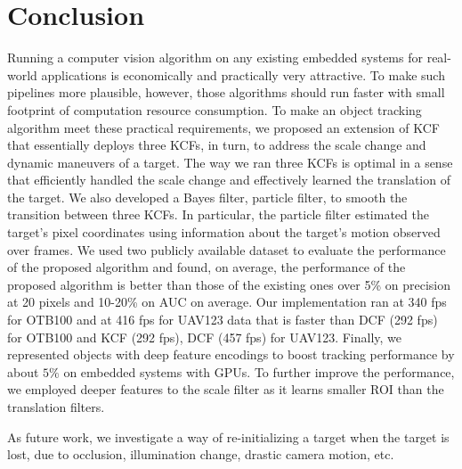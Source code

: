 \documentclass[10pt,twocolumn,letterpaper]{article}
\begin{document}
\section{Conclusion} \label{sc:Conclusion}
Running a computer vision algorithm on any existing embedded systems
for real-world applications is economically and practically very
attractive. To make such pipelines more plausible, however, those
algorithms should run faster with small footprint of computation
resource consumption. To make an object tracking algorithm meet these
practical requirements, we proposed an extension of KCF that
essentially deploys three KCFs, in turn, to address the scale change
and dynamic maneuvers of a target. The way we ran three KCFs is
optimal in a sense that efficiently handled the scale change and
effectively learned the translation of the target. We also developed a
Bayes filter, particle filter, to smooth the transition between three
KCFs. In particular, the particle filter estimated the target's pixel
coordinates using information about the target's motion observed over
frames. We used two publicly available dataset to evaluate the
performance of the proposed algorithm and found, on average, the
performance of the proposed algorithm is better than those of the
existing ones over 5\% on precision at 20 pixels and 10-20\% on AUC on
average. Our implementation ran at 340 fps for OTB100 and at 416 fps
for UAV123 data that is faster than DCF (292 fps) for OTB100 and KCF
(292 fps), DCF (457 fps) for UAV123. Finally, we represented objects with deep
feature encodings to boost tracking performance by about $5\%$ on embedded systems with GPUs. 
To further improve the performance, we employed deeper features to the scale filter as it learns smaller ROI
than the translation filters.

As future work, we investigate a way of re-initializing a target when
the target is lost, due to occlusion, illumination change, drastic
camera motion, etc.

{\small


}
\end{document}
